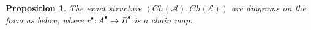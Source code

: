 \documentclass[11pt]{article}
\newtheorem{prop}[theorem]{Proposition}
\theoremstyle{definition}
\theoremstyle{remark}
\newcommand{\chain}[1]{#1^{\bullet}}
\begin{document}
            \begin{prop}
                The exact structure $(Ch(\mathcal{A}),Ch(\mathcal{E}))$ are diagrams on the form as below, where $\chain{r}:\chain{A}\rightarrow\chain{B}$ is a chain map.
                \begin{center}
                \end{center}
            \end{prop}
\end{document}

